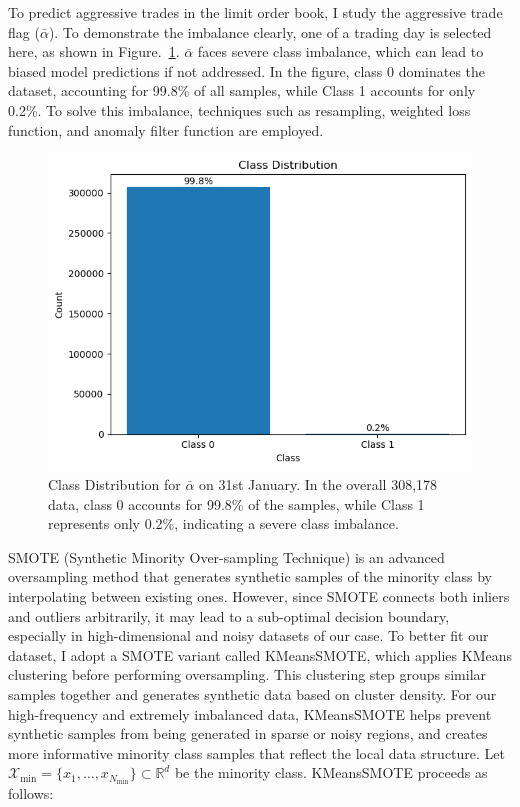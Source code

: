 To predict aggressive trades in the limit order book, I study the aggressive trade flag ($\bar{\alpha}$). To demonstrate the imbalance clearly, one of a trading day is selected here, as shown in Figure.~\ref{fig: aflag_class_distribution}. $\bar{\alpha}$ faces severe class imbalance, which can lead to biased model predictions if not addressed. In the figure, class 0 dominates the dataset, accounting for 99.8\% of all samples, while Class 1 accounts for only 0.2\%. To solve this imbalance, techniques such as resampling, weighted loss function, and anomaly filter function are employed. 
\begin{figure}[h]
    \centering
    \includegraphics[width=0.8\linewidth]{figures/Imbalaced data for aflag.png}
    \caption{Class Distribution for $\bar{\alpha}$ on 31st January. In the overall 308,178 data, class 0 accounts for 99.8\% of the samples, while Class 1 represents only 0.2\%, indicating a severe class imbalance.}
    \label{fig: aflag_class_distribution}
\end{figure}

SMOTE (Synthetic Minority Over-sampling Technique) is an advanced oversampling method that generates synthetic samples of the minority class by interpolating between existing ones. However, since SMOTE connects both inliers and outliers arbitrarily, it may lead to a sub-optimal decision boundary, especially in high-dimensional and noisy datasets of our case. To better fit our dataset, I adopt a SMOTE variant called KMeansSMOTE, which applies KMeans clustering before performing oversampling. This clustering step groups similar samples together and generates synthetic data based on cluster density. For our high-frequency and extremely imbalanced data, KMeansSMOTE helps prevent synthetic samples from being generated in sparse or noisy regions, and creates more informative minority class samples that reflect the local data structure.
Let $\mathcal{X}_{\text{min}} = \{x_1, \dots, x_{N_{\text{min}}}\} \subset \mathbb{R}^d$ be the minority class. KMeansSMOTE proceeds as follows:

